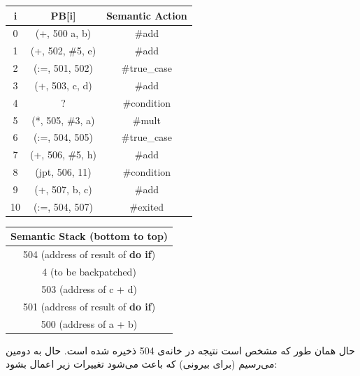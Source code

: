 \documentclass[]{article}
\begin{document}
\begin{latin}
\centering
\begin{tabular}{|c|c|c|}
    \hline
    i & PB[i] & Semantic Action\\
    \hline
    0 & (+, 500 a, b) & \#add\\
    1 & (+, 502, \#5, e) & \#add\\
    2 & (:=, 501, 502) & \#true\_case\\
    3 & (+, 503, c, d) & \#add\\
    4 & ? & \#condition\\
    5 & (*, 505, \#3, a) & \#mult\\
    6 & (:=, 504, 505) & \#true\_case\\
    7 & (+, 506, \#5, h) & \#add\\
    8 & (jpt, 506, 11) & \#condition\\
    9 & (+, 507, b, c) & \#add\\
    10 & (:=, 504, 507) & \#exited\\
    \hline
\end{tabular}
\begin{tabular}{|c|}
    \hline
    Semantic Stack (bottom to top)\\
    \hline
    504 (address of result of \textbf{do if})\\
    \hline
    4 (to be backpatched)\\
    \hline
    503 (address of c + d)\\
    \hline
    501 (address of result of \textbf{do if})\\
    \hline
    500 (address of a + b)\\
    \hline
\end{tabular}
\end{latin}
حال همان طور که مشخص است نتیجه در خانه‌ی 504 ذخیره شده است. حال به دومین
می‌رسیم (برای \textbf{} بیرونی)
که باعث می‌شود تغییرات زیر اعمال بشود:
\end{document}
